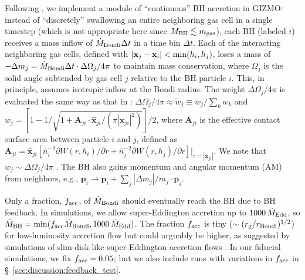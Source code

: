 \documentclass[twocolumn]{aastex631}
\begin{document}
Following \citet{HopkinsWetzelKeres_2018MNRAS.477.1578H}, we implement a module of ``continuous'' BH accretion in {GIZMO}: instead of ``discretely'' swallowing an entire neighboring gas cell in a single timestep \citep{SpringelDiMatteoHernquist_2005MNRAS.361..776S,DiMatteoSpringelHernquist_2005Natur.433..604D} (which is not appropriate here since $M_{\rm BH} \lesssim m_{\rm gas}$), each BH (labeled $i$) receives a mass inflow of $\dot M_{\rm Bondi}\Delta t$ in a time bin $\Delta t$. Each of the interacting neighboring gas cells, defined with $|\mathbf x_j - \mathbf x_i |<{\rm min}(h_i, h_j)$, loses a mass of $-\Delta m_j = \dot M_{\rm Bondi}\Delta t \cdot \Delta \Omega_j /4\pi$ to maintain mass conservation, where $\Omega_j$ is the solid angle subtended by gas cell $j$ relative to the BH particle $i$. This, in principle, assumes isotropic inflow at the Bondi radius. The weight $\Delta \Omega_j /4\pi$ is evaluated the same way as that in \citet{HopkinsWetzelKeres_2018MNRAS.477.1578H}: $\Delta \Omega_j /4\pi\approx \tilde{w}_j \equiv w_j/\sum_k w_k $ and $w_j = [1-1/\sqrt{1+\mathbf{A}_{ji} \cdot \hat{\mathbf{x}}_{ji}/(\pi |\mathbf{x}_{ji}|^2) }]/2$, where $\mathbf{A}_{ji}$ is the effective contact surface area between particle $i$ and $j$, defined as $\mathbf{A}_{ji} = \hat{\mathbf{x}}_{ji} [\bar n_i^{-2} \partial W(r, h_i)/\partial r + \bar n_j^{-2} \partial W(r, h_j)/\partial r ]\vert_{r=|\mathbf{x}_{ji}|}$. We note that $w_j \sim \Delta \Omega_j / 4\pi $ \citep{HopkinsWetzelKeres_2018MNRAS.477.1578H}. The BH also gains momentum and angular momentum (AM) from neighbors, e.g., $\mathbf{p}_i \to \mathbf{p}_i + \sum_j|\Delta m_j|/m_j\cdot \mathbf{p}_j$. 

Only a fraction, $f_{\rm acc}$, of $\dot M_{\rm Bondi}$ should eventually reach the BH due to BH feedback. In simulations, we allow super-Eddington accretion up to $1000\,\dot M_{\rm Edd}$, so $\dot M_{\rm BH} = \min (f_{\rm acc}\dot M_{\rm Bondi}, 1000\,\dot M_{\rm Edd})$. The fraction $f_{\rm acc}$ is tiny ($\sim (r_{\rm g}/r_{\rm Bondi})^{1/2}$) for low-luminosity accretion flow \citep{GuoStoneKim_2023ApJ...946...26G} but could arguably be higher, as suggested by simulations of slim-disk-like super-Eddington accretion flows \citep{JiangStoneDavis_2014ApJ...796..106J,ZhangStoneWhite_2025arXiv250910638Z}. In our fiducial simulations, we fix $f_{\rm acc}=0.05$; but we also include runs with variations in $f_{\rm acc}$ in \S~\ref{sec:discussion:feedback_test}.
\end{document}
